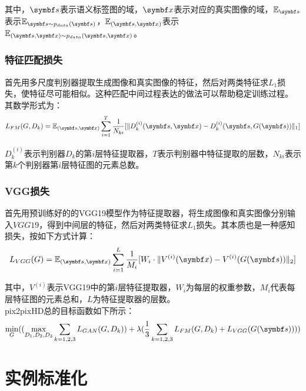 其中，$\vs$表示语义标签图的域，$\vx$表示对应的真实图像的域，$\mathbb{E}_\vs$表示$\mathbb{E}_{\vs \sim p_{data}(\vs)}$，$\mathbb{E}_{(\vs,\vx)}$表示$\mathbb{E}_{(\vs,\vx) \sim p_{data}(\vs,\vx)}$。

\subsubsection{特征匹配损失}

首先用多尺度判别器提取生成图像和真实图像的特征，然后对两类特征求$L_1$损失，使特征尽可能相似。这种匹配中间过程表达的做法可以帮助稳定训练过程。
其数学形式为：
\begin{equation}
	L_{FM}(G,D_k)=\mathbb{E}_{(\vs,\vx)} \sum_{i=1}^T{\frac{1}{N_{ki}} [\lVert D_{k}^{(i)}(\vs,\vx)-D_{k}^{(i)}(\vs,G(\vs)) \rVert_1]}
\end{equation}

$D_{k}^{(i)}$表示判别器$D_k$的第$i$层特征提取器，$T$表示判别器中特征提取的层数，$N_{ki}$表示第$k$个判别器第$i$层特征图的元素总数。

\subsubsection{VGG损失}

首先用预训练好的的VGG19模型作为特征提取器，将生成图像和真实图像分别输入$VGG19$，得到中间层的特征，然后对两类特征求$L_1$损失。其本质也是一种感知损失，按如下方式计算：
\begin{equation}
	L_{VGG}(G)=\mathbb{E}_{(\vs,\vx)} \sum_{i=1}^L{\frac{1}{M_{i}} [W_i \cdot \lVert V^{(i)}(\vx)-V^{(i)}(G(\vs)) \rVert_2]}
\end{equation}

其中，$V^{(i)}$表示VGG19中的第$i$层特征提取器，$W_i$为每层的权重参数，$M_i$代表每层特征图的元素总和，$L$为特征提取器的层数。
~\\

pix2pixHD总的目标函数如下所示：
\begin{equation}
	\underset{G}{\min}((\underset{D_1,D_2,D_3}{\max} \sum_{k=1,2,3}{L_{GAN}(G,D_k)})+\lambda (\frac{1}{3}\sum_{k=1,2,3}{L_{FM}(G,D_k) }+L_{VGG}{(G(\vs))}))
\end{equation}

\section{实例标准化}

